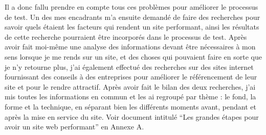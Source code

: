 \documentclass[report]{tnreport}
\begin{document}
Il a donc fallu prendre en compte tous ces problèmes pour améliorer le processus de test. Un des mes encadrants m’a ensuite demandé de faire des recherches pour savoir quels étaient les facteurs qui rendent un site performant, ainsi les résultats de cette recherche pourraient être incorporés dans le processus de test. Après avoir fait moi-même une analyse des informations devant être nécessaires à mon sens lorsque je me rends sur un site, et des choses qui pouvaient faire en sorte que je n’y retourne plus, j’ai également effectué des recherches sur des sites internet fournissant des conseils à des entreprises pour améliorer le référencement de leur site et pour le rendre attractif. Après avoir fait le bilan des deux recherches, j’ai mis toutes les informations en commun et les ai regroupé par thème : le fond, la forme et la technique, en séparant bien les différents moments avant, pendant et après la mise en service du site. Voir document intitulé “Les grandes étapes pour avoir un site web performant” en Annexe A.
\end{document}
